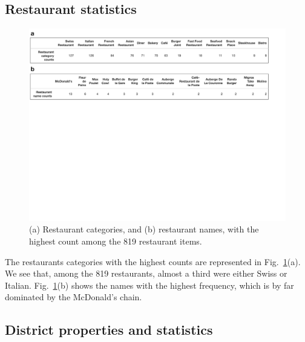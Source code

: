 \documentclass[12pt]{article}
\begin{document}
\subsection{Restaurant statistics}

\begin{figure}
\begin{center}
\includegraphics[width=\textwidth]{Figures/Fig4}
\caption{\label{fig4} (a) Restaurant categories, and (b) restaurant names, with the highest count among the 819 restaurant items.}
\end{center}
\end{figure}

The restaurants categories with the highest counts are represented in Fig.~\ref{fig4}(a). We see that, among the 819 restaurants, almost a third were either Swiss or Italian. Fig.~\ref{fig4}(b) shows the names with the highest frequency, which is by far dominated by the McDonald's chain.

\subsection{District properties and statistics}
\end{document}
